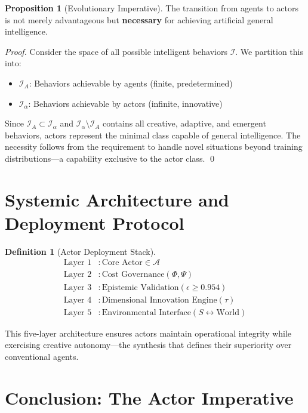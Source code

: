 \documentclass[11pt]{article}
\theoremstyle{definition}
\newtheorem{definition}{Definition}
\newtheorem{proposition}{Proposition}
\newcommand{\actors}{\mathcal{A}}
\begin{document}
\begin{proposition}[Evolutionary Imperative]
The transition from agents to actors is not merely advantageous but \textbf{necessary} for achieving artificial general intelligence.
\end{proposition}

\begin{proof}
Consider the space of all possible intelligent behaviors $\mathcal{I}$. We partition this into:
\begin{itemize}
    \item $\mathcal{I}_A$: Behaviors achievable by agents (finite, predetermined)
    \item $\mathcal{I}_\alpha$: Behaviors achievable by actors (infinite, innovative)
\end{itemize}

Since $\mathcal{I}_A \subset \mathcal{I}_\alpha$ and $\mathcal{I}_\alpha \setminus \mathcal{I}_A$ contains all creative, adaptive, and emergent behaviors, actors represent the minimal class capable of general intelligence. The necessity follows from the requirement to handle novel situations beyond training distributions—a capability exclusive to the actor class. \qed
\end{proof}

\section{Systemic Architecture and Deployment Protocol}

\begin{definition}[Actor Deployment Stack]
\begin{align}
\text{Layer 1} &: \text{Core Actor} \in \actors \\
\text{Layer 2} &: \text{Cost Governance} (\Phi, \Psi) \\
\text{Layer 3} &: \text{Epistemic Validation} (\epsilon \geq 0.954) \\
\text{Layer 4} &: \text{Dimensional Innovation Engine} (\tau) \\
\text{Layer 5} &: \text{Environmental Interface} (S \leftrightarrow \text{World})
\end{align}
\end{definition}

This five-layer architecture ensures actors maintain operational integrity while exercising creative autonomy—the synthesis that defines their superiority over conventional agents.

\section{Conclusion: The Actor Imperative}
\end{document}
